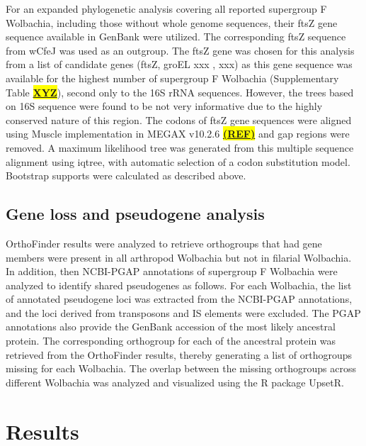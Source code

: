 \documentclass[10pt, a4paper, twocolumn]{article} %
\begin{document}
For an expanded phylogenetic analysis covering all reported supergroup F Wolbachia, including those without whole genome sequences, their ftsZ gene sequence available in GenBank were utilized. The corresponding ftsZ sequence from wCfeJ was used as an outgroup. The ftsZ gene was chosen for this analysis from a list of candidate genes (ftsZ, groEL xxx , xxx) as this gene sequence was available for the highest number of supergroup F Wolbachia (Supplementary Table \underline{\textbf{\colorbox{Yellow}{XYZ}}}), second only to the 16S rRNA sequences. However, the trees based on 16S sequence were found to be not very informative due to the highly conserved nature of this region. The codons of ftsZ gene sequences were aligned using Muscle implementation in MEGAX v10.2.6 \underline{\textbf{\colorbox{Yellow}{(REF)}}} and gap regions were removed. A maximum likelihood tree was generated from this multiple sequence alignment using iqtree, with automatic selection of a codon substitution model. Bootstrap supports were calculated as described above.

\subsection{Gene loss and pseudogene analysis}
OrthoFinder results were analyzed to retrieve orthogroups that had gene members were present in all arthropod Wolbachia but not in filarial Wolbachia. In addition, then NCBI-PGAP annotations of supergroup F Wolbachia were analyzed to identify shared pseudogenes as follows. For each Wolbachia, the list of annotated pseudogene loci was extracted from the NCBI-PGAP annotations, and the loci derived from transposons and IS elements were excluded. The PGAP annotations also provide the GenBank accession of the most likely ancestral protein. The corresponding orthogroup for each of the ancestral protein was retrieved from the OrthoFinder results, thereby generating a list of orthogroups missing for each Wolbachia. The overlap between the missing orthogroups across different Wolbachia was analyzed and visualized using the R package UpsetR.


\section{Results}
\end{document}
